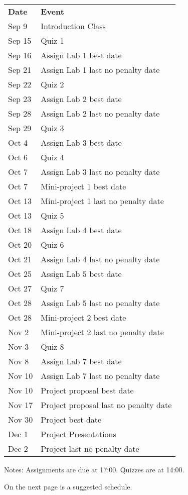 \documentclass[11pt]{article}
\begin{document}
\begin{tabular}{ll}\hline
{\bf Date} & {\bf Event}\\
Sep 9 & Introduction Class\\
Sep 15 & Quiz 1\\
Sep 16 & Assign Lab 1 best date\\
Sep 21 & Assign Lab 1 last no penalty date\\
Sep 22 & Quiz 2 \\
Sep 23 & Assign Lab 2 best date\\
Sep 28 & Assign Lab 2 last no penalty date\\
Sep 29 & Quiz 3 \\
Oct 4 & Assign Lab 3 best date\\
Oct 6 & Quiz 4\\
Oct 7 & Assign Lab 3 last no penalty date\\
Oct 7 & Mini-project 1 best date\\
Oct 13 & Mini-project 1 last no penalty date\\
Oct 13 & Quiz 5\\
Oct 18 & Assign Lab 4 best date\\
Oct 20 & Quiz 6\\
Oct 21 & Assign Lab 4 last no penalty date\\
Oct 25 & Assign Lab 5 best date\\
Oct 27 & Quiz 7\\
Oct 28 & Assign Lab 5 last no penalty date\\
Oct 28 & Mini-project 2 best date\\
Nov 2 & Mini-project 2 last no penalty date\\
Nov 3 & Quiz 8\\
Nov 8 & Assign Lab 7 best date\\
Nov 10 & Assign Lab 7 last no penalty date\\
Nov 10 & Project proposal best date\\
Nov 17 & Project proposal last no penalty date\\
Nov 30 & Project best date\\
Dec 1 & Project Presentations \\
Dec 2 & Project last no penalty date\\ 
\hline
\end{tabular}

Notes: Assignments are due at 17:00. Quizzes are at 14:00.  


\vspace{1in}

On the next page is a suggested schedule.

\end{document}
